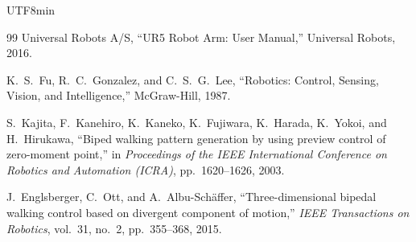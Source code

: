 \documentclass[a4paper,11pt]{report}
\begin{document}
\begin{CJK}{UTF8}{min}
\begin{thebibliography}{99}
Universal Robots A/S,
``UR5 Robot Arm: User Manual,''
Universal Robots, 2016.

K.~S.~Fu, R.~C.~Gonzalez, and C.~S.~G.~Lee,
``Robotics: Control, Sensing, Vision, and Intelligence,''
McGraw-Hill, 1987.

S.~Kajita, F.~Kanehiro, K.~Kaneko, K.~Fujiwara, K.~Harada, K.~Yokoi, and H.~Hirukawa,
``Biped walking pattern generation by using preview control of zero-moment point,''
in \textit{Proceedings of the IEEE International Conference on Robotics and Automation (ICRA)}, 
pp.~1620--1626, 2003.

J.~Englsberger, C.~Ott, and A.~Albu-Schäffer,
``Three-dimensional bipedal walking control based on divergent component of motion,''
\textit{IEEE Transactions on Robotics}, vol.~31, no.~2, pp.~355--368, 2015.



\end{thebibliography}


\end{CJK}
\end{document}
